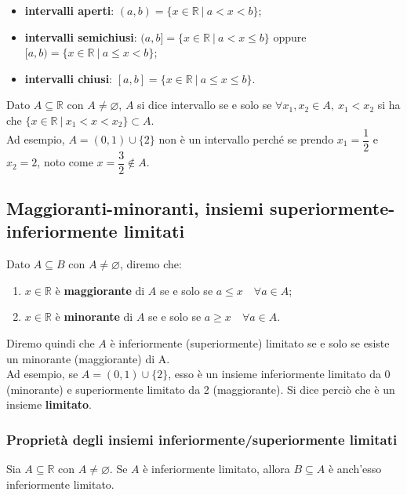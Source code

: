 \documentclass{article}
\begin{document}
\begin{itemize}
    \item \textbf{intervalli aperti}: $(a,b) = \{ x \in \mathbb{R} \ | \ a < x < b \}$;
    \item \textbf{intervalli semichiusi}: $(a,b] = \{ x \in \mathbb{R} \ | \ a < x \leq b \}$ oppure $[a,b) = \{ x \in \mathbb{R} \ | \ a \leq x < b \}$;
    \item \textbf{intervalli chiusi}: $[a,b] = \{ x \in \mathbb{R} \ | \ a \leq x \leq b \}$.
\end{itemize}

\noindent Dato $A \subseteq \mathbb R$ con $A \neq \varnothing$, $A$ si dice intervallo se e solo se $\forall x_1, x_2 \in A, \ x_1 < x_2$ si ha che $\{ x \in \mathbb{R} \ | \ x_1 < x < x_2 \} \subset A$. \\
Ad esempio, $A = (0,1) \cup \{2\}$ non è un intervallo perché se prendo $x_1 = \dfrac{1}{2}$ e $x_2 = 2$, noto come $x = \dfrac{3}{2} \notin A$. 

\subsection{Maggioranti-minoranti, insiemi superiormente-inferiormente limitati}
Dato $A \subseteq B$ con $A \neq \varnothing$, diremo che:

\begin{enumerate}
    \item $x \in \mathbb{R}$ è \textbf{maggiorante} di $A$ se e solo se $a \leq x \quad \forall a \in A$;
    \item $x \in \mathbb{R}$ è \textbf{minorante} di $A$ se e solo se $a \geq x \quad \forall a \in A$.
\end{enumerate}

\noindent Diremo quindi che $A$ è inferiormente (superiormente) limitato se e solo se esiste un minorante (maggiorante) di A. \\
Ad esempio, se $A = (0,1) \cup \{2\}$, esso è un insieme inferiormente limitato da 0 (minorante) e superiormente limitato da 2 (maggiorante). Si dice perciò che è un insieme \textbf{limitato}.

\subsubsection{Proprietà degli insiemi inferiormente/superiormente limitati}
Sia $A \subseteq \mathbb{R}$ con $A \neq \varnothing$. Se $A$ è inferiormente limitato, allora $B \subseteq A$ è anch'esso inferiormente limitato. \\
\end{document}

